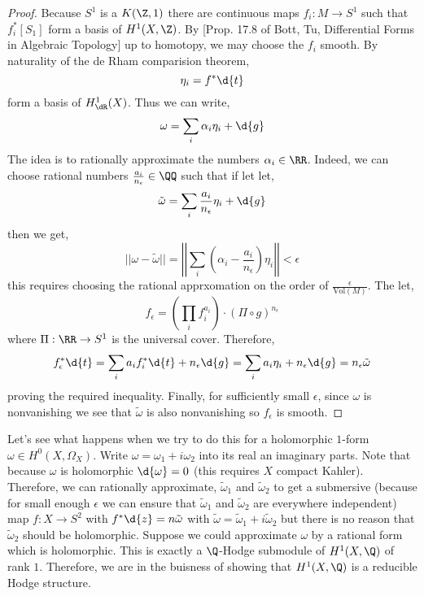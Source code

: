 \documentclass[12pt]{article}
\begin{document}
\begin{proof}
Because $S^1$ is a $K(\Z, 1)$ there are continuous maps $f_i : M \to S^1$ such that $f_i^* [S_1]$ form a basis of $H^1(X, \Z)$. By [Prop. 17.8 of Bott, Tu, Differential Forms in Algebraic Topology] up to homotopy, we may choose the $f_i$ smooth. By naturality of the de Rham comparision theorem, 
\[ \eta_i = f^* \d{t} \] 
form a basis of $H^1_{\dR}(X)$. Thus we can write,
\[ \omega = \sum_{i} \alpha_i \eta_i + \d{g} \]
The idea is to rationally approximate the numbers $\alpha_i \in \RR$. Indeed, we can choose rational numbers $\frac{a_i}{n_\epsilon} \in \QQ$ such that if let let,
\[ \tilde{\omega} = \sum_i \frac{a_i}{n_\epsilon} \eta_i  + \d{g} \]
then we get,
\[ || \omega - \tilde{\omega} || = \left| \left| \sum_i \left( \alpha_i - \frac{a_i}{n_\epsilon}  \right) \eta_i \right| \right| < \epsilon \]
this requires choosing the rational apprxomation on the order of $\frac{\epsilon}{\mathrm{Vol}(M)}$. The let,
\[ f_\epsilon = \left( \prod_i f_i^{a_i} \right) \cdot (\Pi \circ g)^{n_\epsilon} \]
where $\Pi : \RR \to S^1$ is the universal cover. Therefore, 
\[ f_\epsilon^* \d{t} = \sum_i a_i f_i^* \d{t} + n_\epsilon \d{g} = \sum_i a_i \eta_i + n_\epsilon \d{g} = n_\epsilon \tilde{\omega} \]
proving the required inequality. Finally, for sufficiently small $\epsilon$, since $\omega$ is nonvanishing we see that $\tilde{\omega}$ is also nonvanishing so $f_\epsilon$ is smooth. 
\end{proof}

\begin{rmk}
Let's see what happens when we try to do this for a holomorphic $1$-form $\omega \in H^0(X, \Omega_X)$. Write $\omega = \omega_1 + i \omega_2$ into its real an imaginary parts. Note that because $\omega$ is holomorphic $\d{\omega} = 0$ (this requires $X$ compact Kahler). Therefore, we can rationally approximate, $\tilde{\omega}_1$ and $\tilde{\omega}_2$ to get a submersive (because for small enough $\epsilon$ we can ensure that $\tilde{\omega}_1$ and $\tilde{\omega}_2$ are everywhere independent) map $f : X \to S^2$ with $f^* \d{z} = n \tilde{\omega}$ with $\tilde{\omega} = \tilde{\omega}_1 + i \tilde{\omega}_2$ but there is no reason that $\tilde{\omega}_2$ should be holomorphic. Suppose we could approximate $\omega$ by a rational form which is holomorphic. This is exactly a $\Q$-Hodge submodule of $H^1(X, \Q)$ of rank $1$. Therefore, we are in the buisness of showing that $H^1(X, \Q)$ is a reducible Hodge structure.  
\end{rmk}
\end{document}
